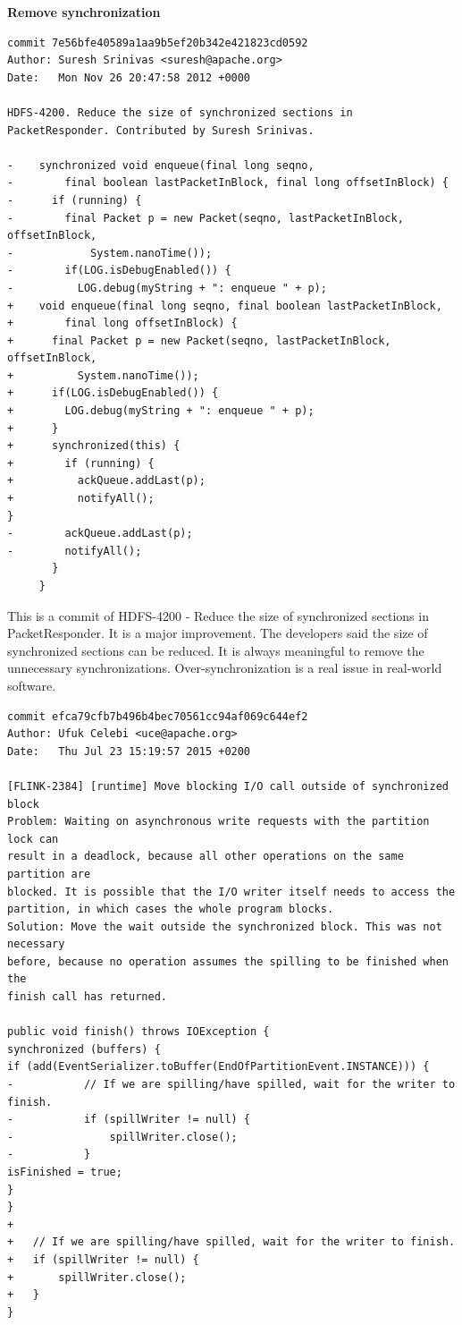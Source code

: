\documentclass[conference]{IEEEtran}
\begin{document}
\textbf{Remove synchronization}
\begin{lstlisting}
commit 7e56bfe40589a1aa9b5ef20b342e421823cd0592
Author: Suresh Srinivas <suresh@apache.org>
Date:   Mon Nov 26 20:47:58 2012 +0000

HDFS-4200. Reduce the size of synchronized sections in PacketResponder. Contributed by Suresh Srinivas.

-    synchronized void enqueue(final long seqno,
-        final boolean lastPacketInBlock, final long offsetInBlock) {
-      if (running) {
-        final Packet p = new Packet(seqno, lastPacketInBlock, offsetInBlock,
-            System.nanoTime());
-        if(LOG.isDebugEnabled()) {
-          LOG.debug(myString + ": enqueue " + p);
+    void enqueue(final long seqno, final boolean lastPacketInBlock,
+        final long offsetInBlock) {
+      final Packet p = new Packet(seqno, lastPacketInBlock, offsetInBlock,
+          System.nanoTime());
+      if(LOG.isDebugEnabled()) {
+        LOG.debug(myString + ": enqueue " + p);
+      }
+      synchronized(this) {
+        if (running) {
+          ackQueue.addLast(p);
+          notifyAll();
}
-        ackQueue.addLast(p);
-        notifyAll();
       }
     }
\end{lstlisting}

This is a commit of HDFS-4200 - Reduce the size of synchronized sections in PacketResponder. It is a major improvement. The developers said the size of synchronized sections can be reduced. It is always meaningful to remove the unnecessary synchronizations. Over-synchronization \cite{conf/sigsoft/GuJSZL15} is a real issue in real-world software.

\begin{lstlisting}
commit efca79cfb7b496b4bec70561cc94af069c644ef2
Author: Ufuk Celebi <uce@apache.org>
Date:   Thu Jul 23 15:19:57 2015 +0200

[FLINK-2384] [runtime] Move blocking I/O call outside of synchronized block
Problem: Waiting on asynchronous write requests with the partition lock can
result in a deadlock, because all other operations on the same partition are
blocked. It is possible that the I/O writer itself needs to access the
partition, in which cases the whole program blocks.
Solution: Move the wait outside the synchronized block. This was not necessary
before, because no operation assumes the spilling to be finished when the
finish call has returned.

public void finish() throws IOException {
synchronized (buffers) {
if (add(EventSerializer.toBuffer(EndOfPartitionEvent.INSTANCE))) {
-			// If we are spilling/have spilled, wait for the writer to finish.
-			if (spillWriter != null) {
-				spillWriter.close();
-			}
isFinished = true;
}
}
+
+	// If we are spilling/have spilled, wait for the writer to finish.
+	if (spillWriter != null) {
+		spillWriter.close();
+	}
}
\end{lstlisting}
\end{document}
